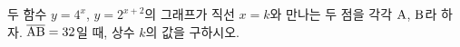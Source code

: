 두 함수 $y=4^{x}$, $y=2^{x+2}$의 그래프가 직선 $x=k$와 만나는 두 점을 각각 $\mathrm{A}$, $\mathrm{B}$라 하자. $\overline{\mathrm{AB}}=32$일 때, 상수 $k$의 값을 구하시오.

